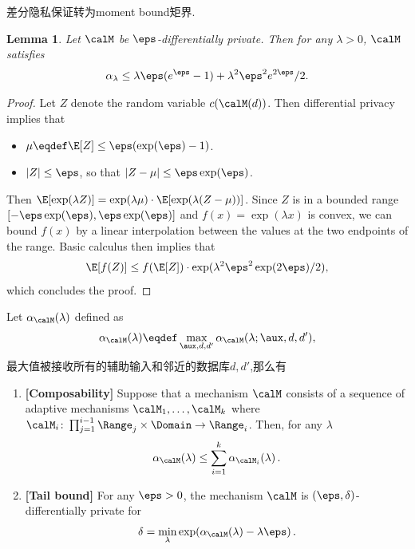 差分隐私保证转为moment bound矩界.

\newtheorem{thm_appendix}{Theorem}[section]
\newtheorem{lem_appendix}[thm_appendix]{Lemma}
\begin{lem_appendix}
  \label{lem:pure_dp_to_logmgf}
  Let $\calM$ be $\eps$-differentially private. Then for any $\lambda > 0$, $\calM$ satisfies
\begin{align*}
\alpha_{\lambda} \leq \lambda\eps(e^{\eps}-1) + \lambda^2\eps^2e^{2\eps}/2.
\end{align*}
  \end{lem_appendix}
\begin{proof}
  Let $Z$ denote the random variable $c(\calM(d))$. Then differential privacy implies that
  \begin{itemize}
      \item $\mu \eqdef \E[Z] \leq \eps(\exp(\eps) - 1)$.  
      \item $|Z| \leq \eps$, so that $|Z-\mu| \leq \eps \exp(\eps)$.
    \end{itemize}
  Then $\E[\exp(\lambda Z)] = \exp(\lambda\mu) \cdot \E[\exp (\lambda(Z-\mu))]$. Since $Z$ is in a bounded range $[-\eps\exp(\eps), \eps\exp(\eps)]$ and $f(x) = \exp(\lambda x)$ is convex, we can bound $f(x)$ by a linear interpolation between the values at the two endpoints of the range. Basic calculus then implies that
  \begin{align*}
    \E[f(Z)] \leq f(\E[Z]) \cdot \exp(\lambda^2 \eps^2 \exp(2\eps)/2),
    \end{align*}
 which concludes the proof.
 \end{proof}
 
\setcounter{theorem}{1}\begin{theorem}\label{thm:property_supp}
    Let $\alpha_\calM(\lambda)$ defined as \[\alpha_\calM(\lambda) \eqdef \max_{\aux, d, d'} \alpha_\calM(\lambda; \aux, d, d'),\]
    最大值被接收所有的辅助输入和邻近的数据库$d,d'$,那么有
    
    \begin{enumerate}
    \item \textbf{[Composability]}
    Suppose that a mechanism $\calM$ consists of a sequence of adaptive mechanisms $\calM_1, \ldots, \calM_k$ where $\calM_i\colon \prod_{j=1}^{i-1}\Range_j\times \Domain \to\Range_i$. Then, for any $\lambda$
    \[\alpha_\calM(\lambda) \leq \sum_{i=1}^k \alpha_{\calM_i}(\lambda)\,.\]
    
    \item \textbf{[Tail bound]}
    For any $\eps>0$, the mechanism $\calM$ is $(\eps, \delta)$-differentially private for
    \[\delta=\min_{\lambda} \exp(\alpha_\calM(\lambda) -\lambda \eps)\,.\]
    \end{enumerate}
    \end{theorem}
     

